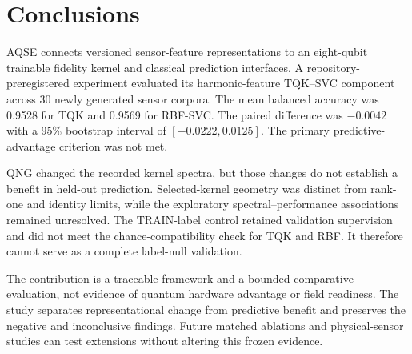 \section{Conclusions}
\label{sec:conclusion}

AQSE connects versioned sensor-feature representations to an eight-qubit trainable fidelity kernel and classical prediction interfaces. A repository-preregistered experiment evaluated its harmonic-feature TQK--SVC component across 30 newly generated sensor corpora. The mean balanced accuracy was 0.9528 for TQK and 0.9569 for RBF-SVC. The paired difference was $-0.0042$ with a 95\% bootstrap interval of $[-0.0222,0.0125]$. The primary predictive-advantage criterion was not met.

QNG changed the recorded kernel spectra, but those changes do not establish a benefit in held-out prediction. Selected-kernel geometry was distinct from rank-one and identity limits, while the exploratory spectral--performance associations remained unresolved. The TRAIN-label control retained validation supervision and did not meet the chance-compatibility check for TQK and RBF. It therefore cannot serve as a complete label-null validation.

The contribution is a traceable framework and a bounded comparative evaluation, not evidence of quantum hardware advantage or field readiness. The study separates representational change from predictive benefit and preserves the negative and inconclusive findings. Future matched ablations and physical-sensor studies can test extensions without altering this frozen evidence.
